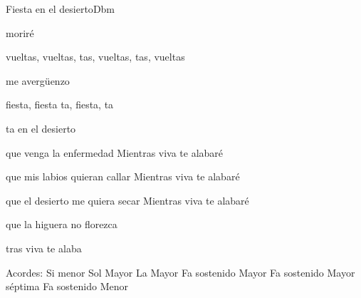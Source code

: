 \documentclass[12pt, spanish]{book}
\begin{document}
\begin{song}{Fiesta en el desierto}{Dbm}
\begin{SBExtraKeys}
{\begin{SBChorus}
                 moriré

                 vueltas, vueltas, tas, vueltas, tas, vueltas

                 me avergüenzo

                 fiesta, fiesta ta, fiesta, ta

                ta en el desierto
            \end{SBChorus}


            \begin{SBOpGroup}
                que venga la enfermedad
                Mientras viva te alabaré

                que mis labios quieran callar
                Mientras viva te alabaré

                que el desierto me quiera secar
                Mientras viva te alabaré

                que la higuera no florezca

                tras viva te alaba
            \end{SBOpGroup}

            \ifChordBk
            \begin{SBOpGroup}
                Acordes:\break
                \upchord{\Bm}\qquad Si menor  \hfill
                \upchord{\G}\qquad Sol Mayor \hfill\null\break
                \upchord{\A}\qquad La Mayor \hfill
                \upchord{\Fs}\qquad Fa sostenido Mayor \hfill\null\break
                \upchord{\Fsseven}\qquad Fa sostenido Mayor s\'eptima \hfill
                \upchord{\Fsm}\qquad Fa sostenido Menor \hfill\null\break
            \end{SBOpGroup}
            \fi
        }\end{SBExtraKeys}
    \end{song}
\end{document}
